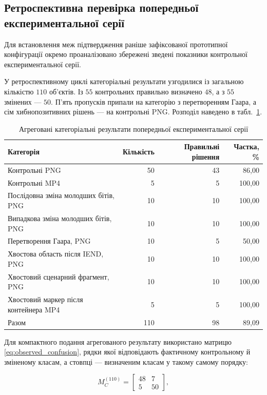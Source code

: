 \subsection{Ретроспективна перевірка попередньої експериментальної серії}

Для встановлення меж підтвердження раніше зафіксованої прототипної конфігурації окремо проаналізовано збережені зведені показники контрольної експериментальної серії.

У ретроспективному циклі категоріальні результати узгодилися із загальною кількістю $110$ об’єктів. Із $55$ контрольних правильно визначено $48$, а з $55$ змінених --- $50$. П’ять пропусків припали на категорію з перетворенням Гаара, а сім хибнопозитивних рішень --- на контрольні PNG. Розподіл наведено в табл.~\ref{tab:ch4_group_results}.

\begin{table}[htbp]
\caption{Агреговані категоріальні результати попередньої експериментальної серії}
\label{tab:ch4_group_results}
\centering
\small
\begin{tabular}{lrrr}
\toprule
Категорія & Кількість & Правильні рішення & Частка, \% \\
\midrule
Контрольні PNG & 50 & 43 & 86,00 \\
Контрольні MP4 & 5 & 5 & 100,00 \\
Послідовна зміна молодших бітів, PNG & 10 & 10 & 100,00 \\
Випадкова зміна молодших бітів, PNG & 10 & 10 & 100,00 \\
Перетворення Гаара, PNG & 10 & 5 & 50,00 \\
Хвостова область після IEND, PNG & 10 & 10 & 100,00 \\
Хвостовий сценарний фрагмент, PNG & 10 & 10 & 100,00 \\
Хвостовий маркер після контейнера MP4 & 5 & 5 & 100,00 \\
\midrule
Разом & 110 & 98 & 89,09 \\
\bottomrule
\end{tabular}
\end{table}

Для компактного подання агрегованого результату використано матрицю \eqref{eq:observed_confusion}, рядки якої відповідають фактичному контрольному й зміненому класам, а стовпці --- визначеним класам у такому самому порядку:

\begin{equation}
M_C^{(110)}=
\begin{bmatrix}
48 & 7\\
5 & 50
\end{bmatrix},
\label{eq:observed_confusion}
\end{equation}

